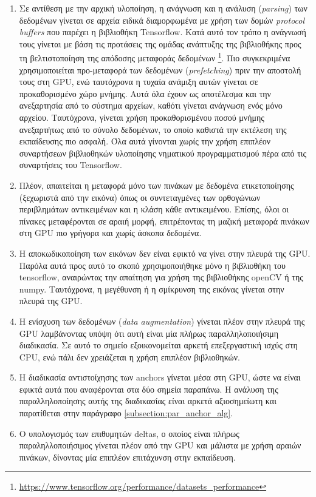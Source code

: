 \begin{enumerate}
\label{enumerate:net_solutions}
\item{Σε αντίθεση με την αρχική υλοποίηση, η ανάγνωση και η ανάλυση (\textit{parsing}) των δεδομένων γίνεται σε αρχεία ειδικά διαμορφωμένα με χρήση των δομών \textit{protocol buffers} που παρέχει η βιβλιοθήκη Tensorflow. Κατά αυτό τον τρόπο η ανάγνωσή τους γίνεται με βάση τις προτάσεις της ομάδας ανάπτυξης της βιβλιοθήκης προς τη βελτιστοποίηση της απόδοσης μεταφοράς δεδομένων \footnote{\url{https://www.tensorflow.org/performance/datasets_performance}}. Πιο συγκεκριμένα χρησιμοποιείται προ-μεταφορά των δεδομένων (\textit{prefetching}) πριν την αποστολή τους στη GPU, ενώ ταυτόχρονα η τυχαία ανάμιξη αυτών γίνεται σε προκαθορισμένο χώρο μνήμης. Αυτά όλα έχουν ως αποτέλεσμα και την ανεξαρτησία από το σύστημα αρχείων, καθότι γίνεται ανάγνωση ενός μόνο αρχείου. Ταυτόχρονα, γίνεται χρήση προκαθορισμένου ποσού μνήμης ανεξαρτήτως από το σύνολο δεδομένων, το οποίο καθιστά την εκτέλεση της εκπαίδευσης πιο ασφαλή. Όλα αυτά γίνονται χωρίς την χρήση επιπλέον συναρτήσεων βιβλιοθηκών υλοποίησης νηματικού προγραμματισμού πέρα από τις συναρτήσεις του Tensorflow.}
\item{Πλέον, απαιτείται η μεταφορά μόνο των πινάκων με δεδομένα ετικετοποίησης (ξεχωριστά από την εικόνα) όπως οι συντεταγμένες των ορθογώνιων περιβλημάτων αντικειμένων και η κλάση κάθε αντικειμένου. Επίσης, όλοι οι πίνακες μεταφέρονται σε αραιή μορφή, επιτρέποντας τη μαζική μεταφορά πινάκων στη GPU πιο γρήγορα και χωρίς άσκοπα δεδομένα.}
\item{Η αποκωδικοποίηση των εικόνων δεν είναι εφικτό να γίνει στην πλευρά της GPU. Παρόλα αυτά προς αυτό το σκοπό χρησιμοποιήθηκε μόνο η βιβλιοθήκη του tensorflow, αναιρώντας την απαίτηση για χρήση της βιβλιοθήκης openCV ή της numpy. Ταυτόχρονα, η μεγέθυνση ή η σμίκρυνση της εικόνας γίνεται στην πλευρά της GPU.}
\item{Η ενίσχυση των δεδομένων (\textit{data augmentation}) γίνεται πλέον στην πλευρά της GPU λαμβάνοντας υπόψη ότι αυτή είναι μία πλήρως παραλληλοποιήσιμη διαδικασία. Σε αυτό το σημείο εξοικονομείται αρκετή επεξεργαστική ισχύς στη CPU, ενώ πάλι δεν χρειάζεται η χρήση επιπλέον βιβλιοθηκών.}
\item{Η διαδικασία αντιστοίχησης των anchors γίνεται μέσα στη GPU, ώστε να είναι εφικτά αυτά που αναφέρονται στα δύο σημεία παραπάνω. Η ανάλυση της παραλληλοποίησης αυτής της διαδικασίας είναι αρκετά αξιοσημείωτη και παρατίθεται στην παράγραφο \ref{subsection:par_anchor_alg}.}
\item{Ο υπολογισμός των επιθυμητών deltas, ο οποίος είναι πλήρως παραληλλοποιήσιμος γίνεται πλέον από την GPU και μάλιστα με χρήση αραιών πινάκων, δίνοντας μία επιπλέον επιτάχυνση στην εκπαίδευση.}

\end{enumerate}

